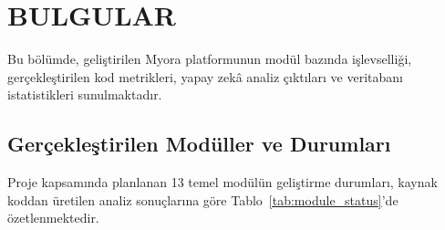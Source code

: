 \section{BULGULAR}
\label{sec:bulgular}

Bu bölümde, geliştirilen Myora platformunun modül bazında işlevselliği, gerçekleştirilen kod metrikleri, yapay zekâ analiz çıktıları ve veritabanı istatistikleri sunulmaktadır.

\subsection{Gerçekleştirilen Modüller ve Durumları}

Proje kapsamında planlanan 13 temel modülün geliştirme durumları, kaynak koddan üretilen analiz sonuçlarına göre Tablo~\ref{tab:module_status}'de özetlenmektedir.

